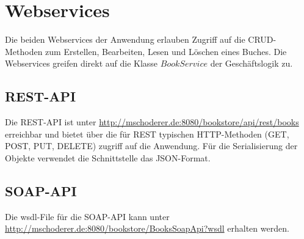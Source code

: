 \documentclass[12pt,a4paper]{book}
\begin{document}
		\chapter{Webservices}
		Die beiden Webservices der Anwendung erlauben Zugriff auf die CRUD-Methoden zum Erstellen, Bearbeiten, Lesen und Löschen eines Buches. Die Webservices greifen direkt auf die Klasse $BookService$ der Geschäftslogik zu.
		\section{REST-API}
		Die REST-API ist unter \href{http://mschoderer.de:8080/bookstore/api/rest/books}{http://mschoderer.de:8080/bookstore/api/rest/books} erreichbar und bietet über die für REST typischen HTTP-Methoden (GET, POST, PUT, DELETE) zugriff auf die Anwendung. Für die Serialisierung der Objekte verwendet die Schnittstelle das JSON-Format.
		\section{SOAP-API}
		Die wsdl-File für die SOAP-API kann unter \href{http://mschoderer.de:8080/bookstore/BooksSoapApi?wsdl}{http://mschoderer.de:8080/bookstore/BooksSoapApi?wsdl} erhalten werden.
		
		
\end{document}
